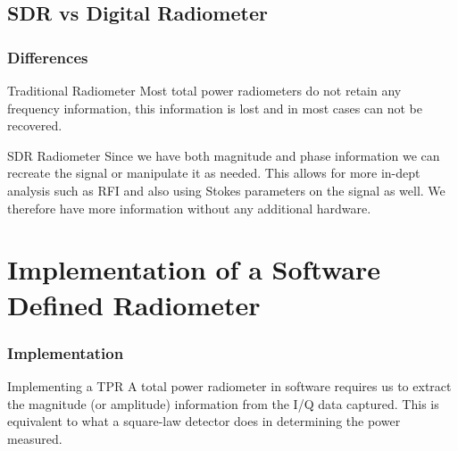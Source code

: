 \documentclass[notes]{beamer}
\begin{document}
\subsection{SDR vs Digital Radiometer}
\begin{frame}
\frametitle{Differences}
\begin{block}{Traditional Radiometer}
Most total power radiometers do not retain any frequency information, this information is lost and in most cases can not be recovered.
\end{block}

\begin{block}{SDR Radiometer}
Since we have both magnitude and phase information we can recreate the signal or manipulate it as needed.  This allows for more in-dept analysis such as RFI and also using Stokes parameters on the signal as well.  We therefore have more information without any additional hardware\cite{Ruf}.
\end{block}
\end{frame}
\section{Implementation of a Software Defined Radiometer}
\begin{frame}
\frametitle{Implementation}
\begin{block}{Implementing a TPR}
A total power radiometer in software requires us to extract the magnitude (or amplitude) information from the I/Q data captured.  This is equivalent to what a square-law detector does in determining the power measured.
\end{block}
\end{frame}
\end{document}
